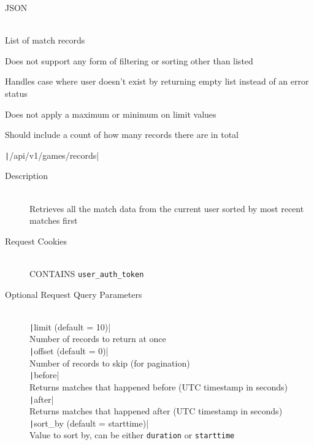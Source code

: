 \documentclass{article}
\begin{document}
\begin{description}
\begin{description}
    JSON
    \item[Response Body] \hfill \\
    List of match records
    \item[Known Issues] 
    \item Does not support any form of filtering or sorting other than listed
    \item Handles case where user doesn't exist by returning empty list instead of an error status
    \item Does not apply a maximum or minimum on limit values
    \item Should include a count of how many records there are in total
  \end{description}

  \item[GET] \texttt|/api/v1/games/records|
  \begin{description}
    \item[Description] \hfill \\
    Retrieves all the match data from the current user sorted by most recent matches first
    \item[Request Cookies] \hfill \\
    CONTAINS \texttt{user_auth_token}
    \item[Optional Request Query Parameters] \hfill \\
    \texttt|limit (default = 10)| \\
    Number of records to return at once \vspace{0.5em} \\
    \texttt|offset (default = 0)| \\
    Number of records to skip (for pagination) \vspace{0.5em} \\
    \texttt|before| \\
    Returns matches that happened before (UTC timestamp in seconds) \vspace{0.5em} \\
    \texttt|after| \\
    Returns matches that happened after (UTC timestamp in seconds) \vspace{0.5em} \\
    \texttt|sort_by (default = starttime)| \\
    Value to sort by, can be either \texttt{duration} or \texttt{starttime} \vspace{0.5em} \\

\end{description}
\end{description}
\end{document}

